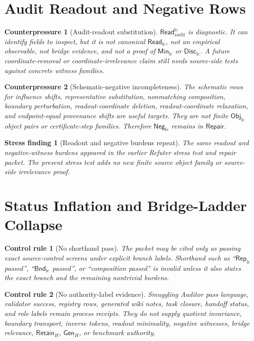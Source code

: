 \documentclass[11pt]{article}
\newcommand{\ObjLC}{\mathsf{Obj}_{\mathrm{lc}}}
\newcommand{\ReadLC}{\mathsf{Read}_{\mathrm{lc}}}
\newcommand{\ReadAudit}{\mathsf{Read}_{\mathrm{audit}}^{\mathrm{lc}}}
\newcommand{\RepLC}{\mathsf{Rep}_{\mathrm{lc}}}
\newcommand{\BndLC}{\mathsf{Bnd}_{\mathrm{lc}}}
\newcommand{\MinLC}{\mathsf{Min}_{\mathrm{lc}}}
\newcommand{\DiscLC}{\mathsf{Disc}_{\mathrm{lc}}}
\newcommand{\NegLC}{\mathsf{Neg}_{\mathrm{lc}}}
\newcommand{\RetainH}{\mathsf{Retain}_{H}}
\newcommand{\GenH}{\mathsf{Gen}_{H}}
\newcommand{\Repair}{\mathsf{Repair}}
\newtheorem{stressfinding}{Stress finding}
\newtheorem{counterpressure}{Counterpressure}
\newtheorem{controlrule}{Control rule}
\begin{document}
\section{Audit Readout and Negative Rows}

\begin{counterpressure}[Audit-readout substitution]
\(\ReadAudit\) is diagnostic. It can identify fields to inspect, but
it is not canonical \(\ReadLC\), not an empirical observable, not
bridge evidence, and not a proof of \(\MinLC\) or \(\DiscLC\). A
future coordinate-removal or coordinate-irrelevance claim still needs
source-side tests against concrete witness families.
\end{counterpressure}

\begin{counterpressure}[Schematic-negative incompleteness]
The schematic rows for influence shifts, representative substitution,
nonmatching composition, boundary perturbation, readout-coordinate
deletion, readout-coordinate relaxation, and endpoint-equal
provenance shifts are useful targets. They are not finite
\(\ObjLC\) object pairs or certificate-step families. Therefore
\(\NegLC\) remains in \(\Repair\).
\end{counterpressure}

\begin{stressfinding}[Readout and negative burdens repeat]
The same readout and negative-witness burdens appeared in the earlier
Refuter stress test and repair packet. The present stress test adds no
new finite source object family or source-side irrelevance proof.
\end{stressfinding}

\section{Status Inflation and Bridge-Ladder Collapse}

\begin{controlrule}[No shorthand pass]
The packet may be cited only as passing exact source-control screens
under explicit branch labels. Shorthand such as ``\(\RepLC\) passed'',
``\(\BndLC\) passed'', or ``composition passed'' is invalid unless it
also states the exact branch and the remaining nontrivial burdens.
\end{controlrule}

\begin{controlrule}[No authority-label evidence]
Smuggling Auditor pass language, validator success, registry rows,
generated wiki notes, task closure, handoff status, and role labels
remain process receipts. They do not supply quotient invariance,
boundary transport, inverse tokens, readout minimality, negative
witnesses, bridge relevance, \(\RetainH\), \(\GenH\), or benchmark
authority.
\end{controlrule}
\end{document}
